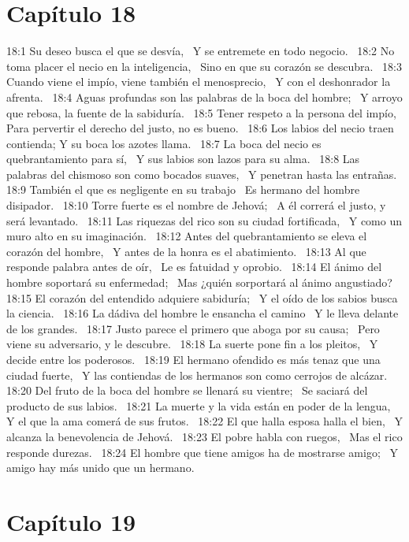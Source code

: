 \section*{Capítulo 18 }

18:1 Su deseo busca el que se desvía,  
Y se entremete en todo negocio.  
18:2 No toma placer el necio en la inteligencia,  
Sino en que su corazón se descubra.  
18:3 Cuando viene el impío, viene también el menosprecio,  
Y con el deshonrador la afrenta.  
18:4 Aguas profundas son las palabras de la boca del hombre;  
Y arroyo que rebosa, la fuente de la sabiduría.  
18:5 Tener respeto a la persona del impío,  
Para pervertir el derecho del justo, no es bueno.  
18:6 Los labios del necio traen contienda; 
Y su boca los azotes llama.  
18:7 La boca del necio es quebrantamiento para sí,  
Y sus labios son lazos para su alma.  
18:8 Las palabras del chismoso son como bocados suaves,  
Y penetran hasta las entrañas.  
18:9 También el que es negligente en su trabajo  
Es hermano del hombre disipador.  
18:10 Torre fuerte es el nombre de Jehová;  
A él correrá el justo, y será levantado.  
18:11 Las riquezas del rico son su ciudad fortificada,  
Y como un muro alto en su imaginación.  
18:12 Antes del quebrantamiento se eleva el corazón del hombre,  
Y antes de la honra es el abatimiento.  
18:13 Al que responde palabra antes de oír,  
Le es fatuidad y oprobio.  
18:14 El ánimo del hombre soportará su enfermedad;  
Mas ¿quién sorportará al ánimo angustiado?  
18:15 El corazón del entendido adquiere sabiduría;  
Y el oído de los sabios busca la ciencia.  
18:16 La dádiva del hombre le ensancha el camino  
Y le lleva delante de los grandes.  
18:17 Justo parece el primero que aboga por su causa;  
Pero viene su adversario, y le descubre.  
18:18 La suerte pone fin a los pleitos,  
Y decide entre los poderosos.  
18:19 El hermano ofendido es más tenaz que una ciudad fuerte,  
Y las contiendas de los hermanos son como cerrojos de alcázar.  
18:20 Del fruto de la boca del hombre se llenará su vientre;  
Se saciará del producto de sus labios.  
18:21 La muerte y la vida están en poder de la lengua,  
Y el que la ama comerá de sus frutos.  
18:22 El que halla esposa halla el bien,  
Y alcanza la benevolencia de Jehová.  
18:23 El pobre habla con ruegos,  
Mas el rico responde durezas.  
18:24 El hombre que tiene amigos ha de mostrarse amigo;  
Y amigo hay más unido que un hermano.  
\section*{Capítulo 19 }

